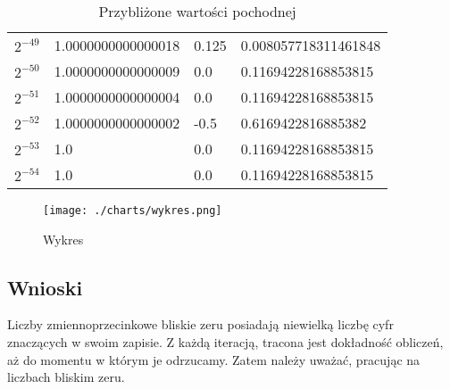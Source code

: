 \documentclass{article}
\begin{document}
\begin{table}[h!]
\begin{tabular}{|l|l|l|l|}
    \(2^{-49}\)&1.0000000000000018&0.125&0.008057718311461848\\
    \(2^{-50}\)&1.0000000000000009&0.0&0.11694228168853815\\
    \(2^{-51}\)&1.0000000000000004&0.0&0.11694228168853815\\
    \(2^{-52}\)&1.0000000000000002&-0.5&0.6169422816885382\\
    \(2^{-53}\)&1.0&0.0&0.11694228168853815\\
    \(2^{-54}\)&1.0&0.0&0.11694228168853815\\
    \hline
    \end{tabular}
    \caption{Przybliżone wartości pochodnej}
    \label{table:12}
\end{table}

\begin{figure}
    \centering
    \texttt{[image: ./charts/wykres.png]}
    \caption{Wykres}
\end{figure}

\subsection{Wnioski}

Liczby zmiennoprzecinkowe bliskie zeru posiadają niewielką liczbę cyfr znaczących w swoim zapisie. Z każdą iteracją, tracona jest dokładność obliczeń, aż do momentu w którym je odrzucamy. Zatem należy uważać, pracując na liczbach bliskim zeru.
\end{document}
